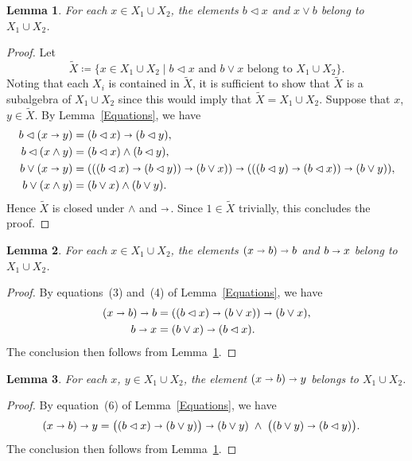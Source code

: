 \documentclass[reqno,a4paper]{amsart}
\newtheorem{lemma}{Lemma}[section]
\theoremstyle{remark}
\theoremstyle{definition}
\newcommand{\ojoin}{\cup}  %
\newcommand{\iimplies}{\shortrightarrow}
\begin{document}
\begin{lemma}\label{lemma: useful terms}
	For each \(x \in X_1 \ojoin X_2\), the elements \(b \lhd x\) and \(x \vee b\) belong to \(X_1 \ojoin X_2\).
\end{lemma}
\begin{proof}
	Let
	\[
		\tilde X \coloneq \{x \in X_1 \ojoin X_2 \mid \text{\(b \lhd x\) and \(b \vee x\) belong to \(X_1 \ojoin X_2\)}\}.
	\]
	Noting that each \(X_i\) is contained in \(\tilde X\), it is sufficient to show that \(\tilde X\) is a subalgebra of \(X_1 \ojoin X_2\) since this would imply that \(\tilde X=X_1\ojoin X_2\).
	Suppose that \(x\), \(y \in \tilde X\). By Lemma~\ref{Equations}, we have
	\begin{align*}
		b\lhd (x\iimplies y) & = (b\lhd x) \iimplies (b\lhd y),                         \\
		b\lhd (x\wedge y)    & = (b\lhd x) \wedge (b\lhd y),                            \\
		b\vee (x\iimplies y) & = (((b\lhd x) \iimplies (b\lhd y)) \iimplies (b \vee x))
		\iimplies (((b\lhd y) \iimplies (b\lhd x)) \iimplies (b \vee y)),               \\
		b\vee (x\wedge y)    & = (b \vee x) \wedge (b \vee y).
	\end{align*}
	Hence \(\tilde X\) is closed under \(\wedge\) and \(\iimplies\). Since \(1 \in \tilde X\) trivially, this concludes the proof.
\end{proof}


\begin{lemma}\label{lemma: (x-> b)->b and b->x}
	For each \(x \in X_1 \ojoin X_2\), the elements \((x\iimplies b)\iimplies b\) and \(b\iimplies x\) belong to \(X_1 \ojoin X_2\).
\end{lemma}
\begin{proof}
	By equations~(3) and~(4) of Lemma~\ref{Equations}, we have
	\begin{align*}
		(x\iimplies b) \iimplies b & = ((b \lhd x) \iimplies (b \vee x)) \iimplies (b \vee x), \\
		b\iimplies x               & = (b \vee x) \iimplies (b \lhd x).
	\end{align*}
	The conclusion then follows from Lemma~\ref{lemma: useful terms}.
\end{proof}



\begin{lemma}\label{lemma: (x->b)->y}
	For each \(x\), \(y \in X_1 \ojoin X_2\), the element \((x\iimplies b)\iimplies y\) belongs to \(X_1 \ojoin X_2\).
\end{lemma}
\begin{proof}
	By equation~(6) of Lemma~\ref{Equations}, we have
	\begin{align*}
		(x\iimplies b) \iimplies y
		 & = \bigl((b \lhd x) \iimplies (b \vee y)\bigr)\iimplies (b \vee y)
		\;\wedge\; \bigl((b \vee y) \iimplies (b \lhd y)\bigr).
	\end{align*}
	The conclusion then follows from Lemma~\ref{lemma: useful terms}.
\end{proof}
\end{document}
